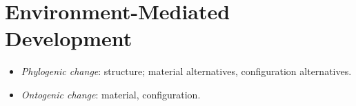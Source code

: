 





\section{Environment-Mediated Development}

\begin{itemize}
    \item \textit{Phylogenic change}: structure; material alternatives, configuration alternatives.
    \item \textit{Ontogenic change}: material, configuration.
\end{itemize}

